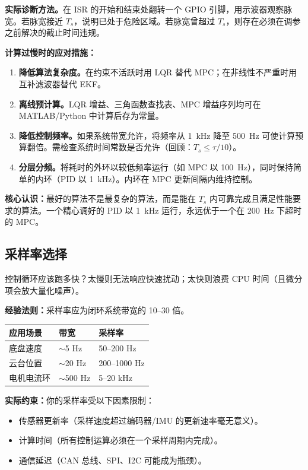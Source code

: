 \begin{mdframed}[linewidth=1pt, innertopmargin=10pt, innerbottommargin=10pt]
\textbf{实际诊断方法。}在 ISR 的开始和结束处翻转一个 GPIO 引脚，用示波器观察脉宽。若脉宽接近 $T_s$，说明已处于危险区域。若脉宽曾超过 $T_s$，则存在必须在调参之前解决的截止时间违规。

\textbf{计算过慢时的应对措施：}
\begin{enumerate}[nosep]
    \item \textbf{降低算法复杂度。}在约束不活跃时用 LQR 替代 MPC；在非线性不严重时用互补滤波器替代 EKF。
    \item \textbf{离线预计算。}LQR 增益、三角函数查找表、MPC 增益序列均可在 MATLAB/Python 中计算后存为常量。
    \item \textbf{降低控制频率。}如果系统带宽允许，将频率从 1~kHz 降至 500~Hz 可使计算预算翻倍。需检查系统时间常数是否允许（回顾：$T_s \leq \tau / 10$）。
    \item \textbf{分层分频。}将耗时的外环以较低频率运行（如 MPC 以 100~Hz），同时保持简单的内环（PID 以 1~kHz）。内环在 MPC 更新间隔内维持控制。
\end{enumerate}

\textbf{核心认识：}最好的算法不是最复杂的算法，而是能在 $T_s$ 内可靠完成且满足性能要求的算法。一个精心调好的 PID 以 1~kHz 运行，永远优于一个在 200~Hz 下超时的 MPC。
\end{mdframed}

\subsection{采样率选择}

控制循环应该跑多快？太慢则无法响应快速扰动；太快则浪费 CPU 时间（且微分项会放大量化噪声）。

\textbf{经验法则：}采样率应为闭环系统带宽的 10--30 倍。

\begin{center}
\begin{tabular}{lll}
\toprule
\textbf{应用场景} & \textbf{带宽} & \textbf{采样率} \\
\midrule
底盘速度 & $\sim$5 Hz & 50--200 Hz \\
云台位置 & $\sim$20 Hz & 200--1000 Hz \\
电机电流环 & $\sim$500 Hz & 5--20 kHz \\
\bottomrule
\end{tabular}
\end{center}

\textbf{实际约束：}你的采样率受以下因素限制：
\begin{itemize}
    \item 传感器更新率（采样速度超过编码器/IMU 的更新速率毫无意义）。
    \item 计算时间（所有控制运算必须在一个采样周期内完成）。
    \item 通信延迟（CAN 总线、SPI、I2C 可能成为瓶颈）。
\end{itemize}

